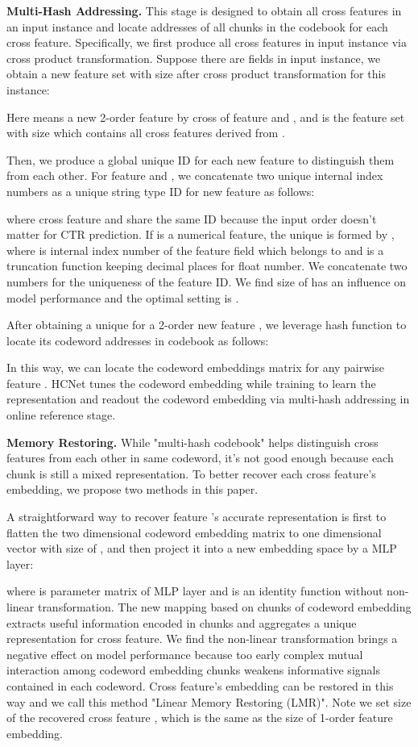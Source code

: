 \documentclass[sigconf,authorversion]{acmart}
\begin{document}
\textbf{Multi-Hash Addressing.}
This stage is designed to obtain all cross features in an input instance and locate addresses of all chunks in the codebook for each cross feature. Specifically, we first produce all cross features in input instance via cross product transformation. Suppose there are  fields in input instance, we obtain a new feature set  with size   after cross product transformation for this instance:
 
Here  means a new 2-order feature by cross of feature  and , and  is the feature set with size  which contains all cross features  derived from  .

Then, we produce a global unique ID for each new feature  to distinguish them from each other. For feature  and , we concatenate two unique internal index numbers as a unique string type ID for new feature  as follows:

where cross feature  and  share the same ID because the input order doesn't matter for CTR prediction. If   is a numerical feature, the unique   is formed by  , where  is internal index number of the feature field which  belongs to and  is a truncation function keeping  decimal places for float number. We concatenate two numbers for the uniqueness of the feature ID. We find size of  has an influence on model performance and the optimal setting is .

After obtaining a unique  for a 2-order new feature , we leverage hash function   to locate its codeword addresses in codebook as follows:


In this way, we can locate the codeword embeddings matrix  for any pairwise feature . HCNet tunes the codeword embedding while training to learn the representation and readout the codeword embedding via multi-hash addressing in online reference stage.

\textbf{Memory Restoring.}
While "multi-hash codebook" helps distinguish cross features from each other in same codeword, it's not good enough because each chunk is still a mixed representation. To better recover each cross feature's embedding, we propose two methods in this paper.

A straightforward way to recover feature 's accurate representation is first to flatten the two dimensional codeword embedding matrix  to one dimensional vector  with size of , and then project it into a new embedding space by a MLP layer:

where   is parameter matrix of MLP layer and  is an identity function without non-linear transformation. The new mapping based on chunks of codeword embedding extracts useful information encoded in chunks and aggregates a unique representation for cross feature. We find the non-linear transformation  brings a negative effect on model performance because too early complex mutual interaction among codeword embedding chunks weakens informative signals contained in each codeword. 
Cross feature's embedding can be restored in this way and we call this method "Linear Memory Restoring (LMR)". Note we set size of the recovered cross feature  , which is the same as the size of 1-order feature embedding.
\end{document}
